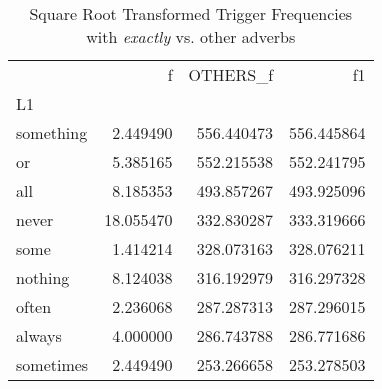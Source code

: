 
\begin{table}[ht]
\caption{Square Root Transformed Trigger Frequencies\\with \textit{exactly} vs. other adverbs}
\label{trig-exactly-others}
\begin{tabular}{lrrr}
\toprule
 & f & OTHERS\_f & f1 \\
L1 &  &  &  \\
\midrule
something & {\cellcolor[HTML]{F3FABF}} \color[HTML]{000000} 2.449490 & {\cellcolor[HTML]{081D58}} \color[HTML]{F1F1F1} 556.440473 & {\cellcolor[HTML]{081D58}} \color[HTML]{F1F1F1} 556.445864 \\
or & {\cellcolor[HTML]{C4E8B4}} \color[HTML]{000000} 5.385165 & {\cellcolor[HTML]{0A1E5C}} \color[HTML]{F1F1F1} 552.215538 & {\cellcolor[HTML]{0A1E5C}} \color[HTML]{F1F1F1} 552.241795 \\
all & {\cellcolor[HTML]{69C5BE}} \color[HTML]{000000} 8.185353 & {\cellcolor[HTML]{233390}} \color[HTML]{F1F1F1} 493.857267 & {\cellcolor[HTML]{233390}} \color[HTML]{F1F1F1} 493.925096 \\
never & {\cellcolor[HTML]{081D58}} \color[HTML]{F1F1F1} 18.055470 & {\cellcolor[HTML]{2CA1C2}} \color[HTML]{F1F1F1} 332.830287 & {\cellcolor[HTML]{2B9FC2}} \color[HTML]{F1F1F1} 333.319666 \\
some & {\cellcolor[HTML]{FCFED1}} \color[HTML]{000000} 1.414214 & {\cellcolor[HTML]{2EA3C2}} \color[HTML]{F1F1F1} 328.073163 & {\cellcolor[HTML]{2EA3C2}} \color[HTML]{F1F1F1} 328.076211 \\
nothing & {\cellcolor[HTML]{6BC6BE}} \color[HTML]{000000} 8.124038 & {\cellcolor[HTML]{35AAC3}} \color[HTML]{F1F1F1} 316.192979 & {\cellcolor[HTML]{35AAC3}} \color[HTML]{F1F1F1} 316.297328 \\
often & {\cellcolor[HTML]{F5FBC2}} \color[HTML]{000000} 2.236068 & {\cellcolor[HTML]{48B9C3}} \color[HTML]{F1F1F1} 287.287313 & {\cellcolor[HTML]{48B9C3}} \color[HTML]{F1F1F1} 287.296015 \\
always & {\cellcolor[HTML]{DDF2B2}} \color[HTML]{000000} 4.000000 & {\cellcolor[HTML]{48B9C3}} \color[HTML]{F1F1F1} 286.743788 & {\cellcolor[HTML]{48B9C3}} \color[HTML]{F1F1F1} 286.771686 \\
sometimes & {\cellcolor[HTML]{F3FABF}} \color[HTML]{000000} 2.449490 & {\cellcolor[HTML]{69C5BE}} \color[HTML]{000000} 253.266658 & {\cellcolor[HTML]{69C5BE}} \color[HTML]{000000} 253.278503 \\

\end{tabular}
\end{table}
